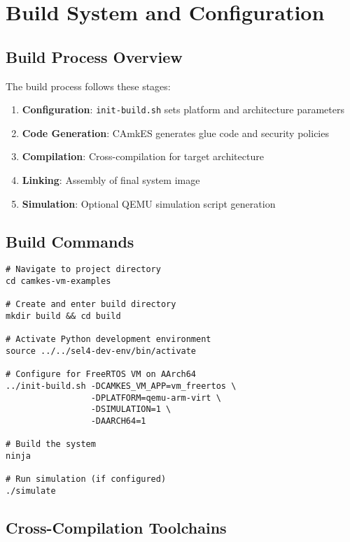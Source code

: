 \documentclass[12pt,a4paper]{article}
\begin{document}
\section{Build System and Configuration}

\subsection{Build Process Overview}

The build process follows these stages:

\begin{enumerate}
    \item \textbf{Configuration}: \texttt{init-build.sh} sets platform and architecture parameters
    \item \textbf{Code Generation}: CAmkES generates glue code and security policies
    \item \textbf{Compilation}: Cross-compilation for target architecture
    \item \textbf{Linking}: Assembly of final system image
    \item \textbf{Simulation}: Optional QEMU simulation script generation
\end{enumerate}

\subsection{Build Commands}


\begin{lstlisting}[style=bash]
# Navigate to project directory
cd camkes-vm-examples

# Create and enter build directory
mkdir build && cd build

# Activate Python development environment
source ../../sel4-dev-env/bin/activate

# Configure for FreeRTOS VM on AArch64
../init-build.sh -DCAMKES_VM_APP=vm_freertos \
                 -DPLATFORM=qemu-arm-virt \
                 -DSIMULATION=1 \
                 -DAARCH64=1

# Build the system
ninja

# Run simulation (if configured)
./simulate
\end{lstlisting}

\subsection{Cross-Compilation Toolchains}
\end{document}
